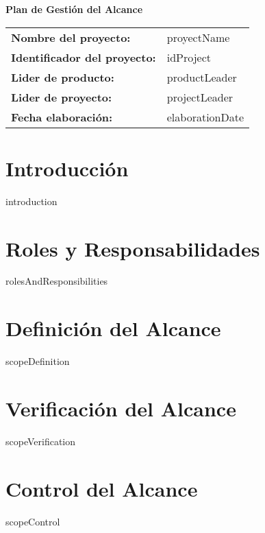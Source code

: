 \documentclass{article}
\begin{document}
    \begin{center}
    {\huge\textbf{Plan de Gestión del Alcance}}\\[14cm]
    \end{center}

    \newcommand{\wrappingmulticolumn}[3]
    {\multicolumn{#1}
    {|>{\hsize=\dimexpr#1\hsize+\tabcolsep * (2 * (#1 - 1) )+\arrayrulewidth* (#1 - 2)\relax}#2|}
    {#3}}
    \renewcommand{\arraystretch}{1.5} %

    \begin{tabularx}{\textwidth}{|>{\raggedright\arraybackslash}p{4cm}|>{\raggedright\arraybackslash}X|} \hline
    \rowcolor{gray!10}\textbf{Nombre del proyecto:} & {{proyectName}} \\[0.3cm]
    \textbf{Identificador del proyecto:} & {{idProject}} \\[0.3cm]
    \textbf{Lider de producto:} & {{productLeader}} \\[0.3cm]
    \textbf{Lider de proyecto:} & {{projectLeader}} \\[0.3cm]
    \textbf{Fecha elaboración:} & {{elaborationDate}} \\ \hline
    \end{tabularx}

    \newpage

    \tableofcontents
    \newpage

    \section{Introducción}
    {{introduction}}
    
    \section{Roles y Responsabilidades}
    {{rolesAndResponsibilities}}

    \section{Definición del Alcance}
    {{scopeDefinition}}

    \section{Verificación del Alcance}
    {{scopeVerification}}

    \section{Control del Alcance}
    {{scopeControl}}
\end{document}
